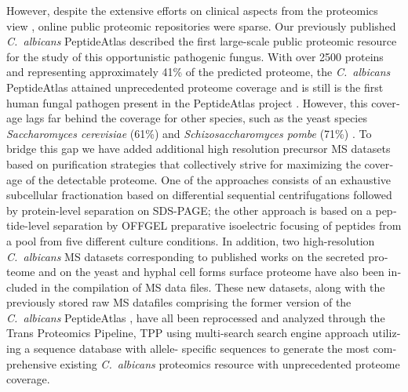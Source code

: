 \begin{otherlanguage}{british}
However, despite the extensive efforts on clinical
aspects from the proteomics view \citep{Pitarch2006,Cabezon2009,Pitarch2009,Rupp2004},
online public proteomic repositories were sparse.
Our previously published \textit{\mbox{C. albicans}} PeptideAtlas \citep{Vialas2013} described the first large-scale public
proteomic resource for the study of this opportunistic pathogenic fungus. With over 2500
proteins and representing approximately 41\% of the predicted proteome, the \textit{\mbox{C. albicans}}
PeptideAtlas attained unprecedented proteome coverage and is still is the first human fungal
pathogen present in the PeptideAtlas project \citep{Desiere2006,Deutsch2015}. 
However, this coverage lags far behind
the coverage for other species, such as the yeast species \textit{Saccharomyces cerevisiae} (61\%)
\citep{King2006} and \textit{Schizosaccharomyces pombe} (71\%) \citep{Gunaratne2013b}. 
To bridge this gap we have added
additional high resolution precursor MS datasets based on purification strategies that
collectively strive for maximizing the coverage of the detectable proteome. One of the
approaches consists of an exhaustive subcellular fractionation based on differential
sequential centrifugations followed by protein-level separation on SDS-PAGE; the other
approach is based on a peptide-level separation by OFFGEL preparative isoelectric focusing
of peptides \citep{Ros2002,Horth2006} from a pool from five different culture conditions. 
In addition, two high-resolution \textit{\mbox{C. albicans}} MS datasets corresponding to published works on the secreted
proteome \citep{Gil-Bona2015a} and on the yeast and hyphal cell forms surface proteome \citep{Gil-Bona2015} have also been
included in the compilation of MS data files. These new datasets, along with the previously
stored raw MS datafiles comprising the former version of the \textit{\mbox{C. albicans}} PeptideAtlas \citep{Vialas2013},
have all been reprocessed and analyzed through the Trans Proteomics Pipeline, TPP \citep{Keller2005, Deutsch2015}
 using multi-search search engine approach utilizing a sequence database with allele-
specific sequences to generate the most comprehensive existing \textit{\mbox{C. albicans}} proteomics
resource with unprecedented proteome coverage.

\begin{table}[t]


\end{table}
\end{otherlanguage}
